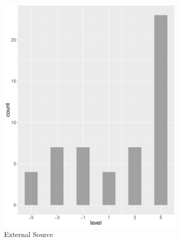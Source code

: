 \begin{figure}
\begin{subfigure}[b]{0.4\textwidth}
        \includegraphics[width=\textwidth]{plots/tennis/hist_level_es}
        \caption{External Source}
        \label{fig:hist_level_tennis_es}
    \end{subfigure}
    ~
    \begin{subfigure}[b]{0.4\textwidth}

\end{subfigure}
\end{figure}
